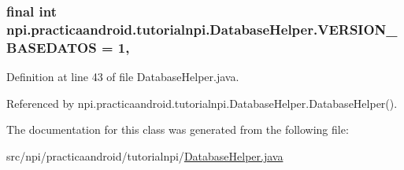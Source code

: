 \hypertarget{classnpi_1_1practicaandroid_1_1tutorialnpi_1_1_database_helper_abb67bfd195cd7b3534a4d51e0dc5260f}{
\subsubsection[{V\-E\-R\-S\-I\-O\-N\-\_\-\-B\-A\-S\-E\-D\-A\-T\-O\-S}]{\setlength{\rightskip}{0pt plus 5cm}final int npi.\-practicaandroid.\-tutorialnpi.\-Database\-Helper.\-V\-E\-R\-S\-I\-O\-N\-\_\-\-B\-A\-S\-E\-D\-A\-T\-O\-S = 1\hspace{0.3cm}{\ttfamily [static]}, {\ttfamily [private]}}}\label{classnpi_1_1practicaandroid_1_1tutorialnpi_1_1_database_helper_abb67bfd195cd7b3534a4d51e0dc5260f}


Definition at line 43 of file Database\-Helper.\-java.



Referenced by npi.\-practicaandroid.\-tutorialnpi.\-Database\-Helper.\-Database\-Helper().



The documentation for this class was generated from the following file\-:\begin{DoxyCompactItemize}
\item 
src/npi/practicaandroid/tutorialnpi/\hyperlink{_database_helper_8java}{Database\-Helper.\-java}\end{DoxyCompactItemize}

